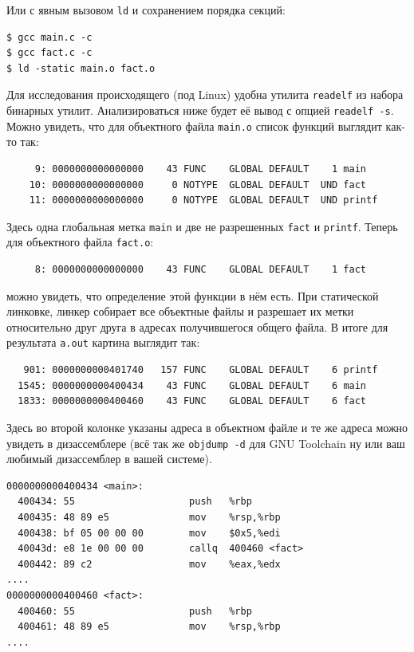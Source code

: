 \documentclass[a4paper,12pt,oneside]{article}
\begin{document}
Или с явным вызовом \lstinline!ld! и сохранением порядка секций:

\begin{verbatim}
$ gcc main.c -c
$ gcc fact.c -c
$ ld -static main.o fact.o
\end{verbatim}

Для исследования происходящего (под Linux) удобна утилита \lstinline!readelf! из набора бинарных утилит. Анализироваться ниже будет её вывод с опцией \lstinline!readelf -s!. Можно увидеть, что для объектного файла \lstinline!main.o! список функций выглядит как-то так:

\begin{verbatim}
     9: 0000000000000000    43 FUNC    GLOBAL DEFAULT    1 main
    10: 0000000000000000     0 NOTYPE  GLOBAL DEFAULT  UND fact
    11: 0000000000000000     0 NOTYPE  GLOBAL DEFAULT  UND printf
\end{verbatim}

Здесь одна глобальная метка \lstinline!main! и две не разрешенных \lstinline!fact! и \lstinline!printf!. Теперь для объектного файла \lstinline!fact.o!:

\begin{verbatim}
     8: 0000000000000000    43 FUNC    GLOBAL DEFAULT    1 fact
\end{verbatim}

можно увидеть, что определение этой функции в нём есть. При статической линковке, линкер собирает все объектные файлы и разрешает их метки относительно друг друга в адресах получившегося общего файла. В итоге для результата \lstinline!a.out! картина выглядит так:

\begin{verbatim}
   901: 0000000000401740   157 FUNC    GLOBAL DEFAULT    6 printf
  1545: 0000000000400434    43 FUNC    GLOBAL DEFAULT    6 main
  1833: 0000000000400460    43 FUNC    GLOBAL DEFAULT    6 fact
\end{verbatim}

Здесь во второй колонке указаны адреса в объектном файле и те же адреса можно увидеть в дизассемблере (всё так же \lstinline!objdump -d! для GNU Toolchain ну или ваш любимый дизассемблер в вашей системе).

\begin{verbatim}
0000000000400434 <main>:
  400434: 55                    push   %rbp
  400435: 48 89 e5              mov    %rsp,%rbp
  400438: bf 05 00 00 00        mov    $0x5,%edi
  40043d: e8 1e 00 00 00        callq  400460 <fact>
  400442: 89 c2                 mov    %eax,%edx
....
0000000000400460 <fact>:
  400460: 55                    push   %rbp
  400461: 48 89 e5              mov    %rsp,%rbp
....
\end{verbatim}
\end{document}
